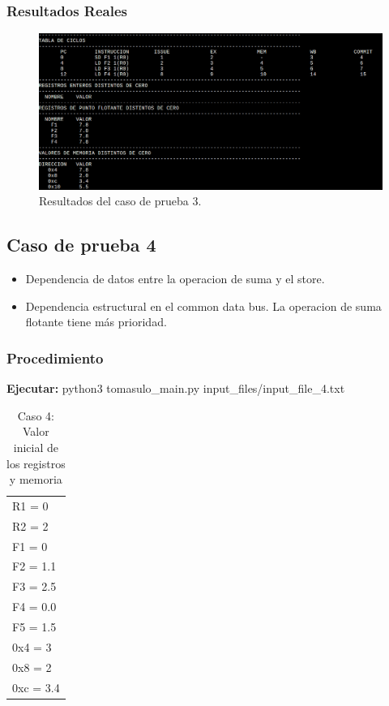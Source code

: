 \documentclass[a4paper]{article}
\begin{document}
	\subsubsection*{Resultados Reales}

	\begin{figure}[H]
	\centering
	\includegraphics[width=1\textwidth]{figures/test3.png}
	\caption{\label{fig:bloques}Resultados del caso de prueba 3.}
	\end{figure}


	\subsection*{Caso de prueba 4}

	\begin{itemize}
		\item Dependencia de datos entre la operacion de suma y el store. 
		\item Dependencia estructural en el common data bus. La operacion de suma flotante tiene más prioridad. 
	\end{itemize}

	\subsubsection*{Procedimiento}

	\textbf{Ejecutar:} python3 tomasulo\_main.py input\_files/input\_file\_4.txt

	\begin{table}[H]
		\centering
		\caption*{Caso 4: Valor inicial de los registros y memoria}
		\begin{tabular}{l}
			R1 = 0 \\
			R2 = 2 \\
			F1 = 0  \\
			F2 = 1.1 \\
			F3 = 2.5 \\
			F4 = 0.0 \\
			F5 = 1.5 \\
			0x4 = 3 \\
			0x8 = 2 \\
			0xc = 3.4 \\
		\end{tabular}
	\end{table}
\end{document}
